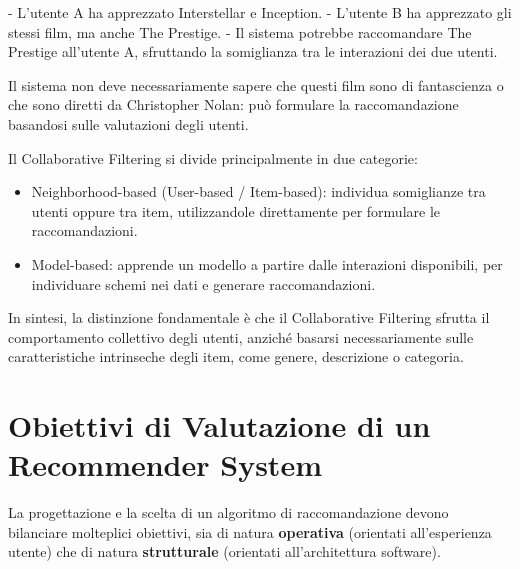 \begin{enumerate}
    - L'utente A ha apprezzato Interstellar e Inception.
    - L'utente B ha apprezzato gli stessi film, ma anche The Prestige.
    - Il sistema potrebbe raccomandare The Prestige all'utente A, sfruttando la somiglianza tra le interazioni dei due utenti.

    Il sistema non deve necessariamente sapere che questi film sono di fantascienza o che sono diretti da Christopher Nolan: può formulare la raccomandazione basandosi sulle valutazioni degli utenti.

    Il Collaborative Filtering si divide principalmente in due categorie:
    \begin{itemize}
        \item Neighborhood-based (User-based / Item-based): individua somiglianze tra utenti oppure tra item, utilizzandole direttamente per formulare le raccomandazioni.
        \item Model-based: apprende un modello a partire dalle interazioni disponibili, per individuare schemi nei dati e generare raccomandazioni.
    \end{itemize}

    In sintesi, la distinzione fondamentale è che il Collaborative Filtering sfrutta il comportamento collettivo degli utenti, anziché basarsi necessariamente sulle caratteristiche intrinseche degli item, come genere, descrizione o categoria.
\end{enumerate}


\section{Obiettivi di Valutazione di un Recommender System}

La progettazione e la scelta di un algoritmo di raccomandazione devono bilanciare molteplici obiettivi, sia di natura \textbf{operativa} (orientati all'esperienza utente) che di natura \textbf{strutturale} (orientati all'architettura software).

